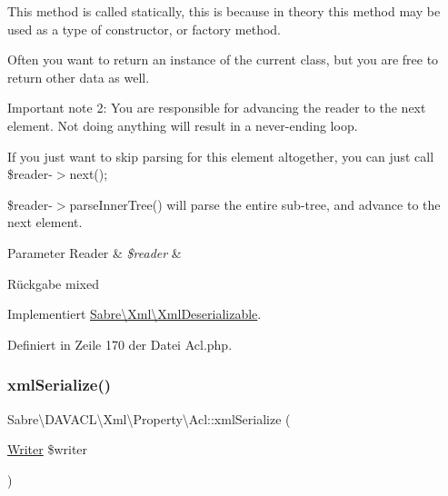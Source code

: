 This method is called statically, this is because in theory this method may be used as a type of constructor, or factory method.

Often you want to return an instance of the current class, but you are free to return other data as well.

Important note 2\+: You are responsible for advancing the reader to the next element. Not doing anything will result in a never-\/ending loop.

If you just want to skip parsing for this element altogether, you can just call \$reader-\/$>$next();

\$reader-\/$>$parse\+Inner\+Tree() will parse the entire sub-\/tree, and advance to the next element.


\begin{DoxyParams}[1]{Parameter}
Reader & {\em \$reader} & \\
\hline
\end{DoxyParams}
\begin{DoxyReturn}{Rückgabe}
mixed 
\end{DoxyReturn}


Implementiert \mbox{\hyperlink{interface_sabre_1_1_xml_1_1_xml_deserializable_a19e0eca545b9a0d93f7d6b69085ade30}{Sabre\textbackslash{}\+Xml\textbackslash{}\+Xml\+Deserializable}}.



Definiert in Zeile 170 der Datei Acl.\+php.

\mbox{\label{class_sabre_1_1_d_a_v_a_c_l_1_1_xml_1_1_property_1_1_acl_a2670dfe65ae9d0745f9785c297a5b320}} 
\subsubsection{\texorpdfstring{xml\+Serialize()}{xmlSerialize()}}
{\footnotesize\ttfamily Sabre\textbackslash{}\+D\+A\+V\+A\+C\+L\textbackslash{}\+Xml\textbackslash{}\+Property\textbackslash{}\+Acl\+::xml\+Serialize (\begin{DoxyParamCaption}\item[{\mbox{\hyperlink{class_sabre_1_1_xml_1_1_writer}{Writer}}}]{\$writer }\end{DoxyParamCaption})}

